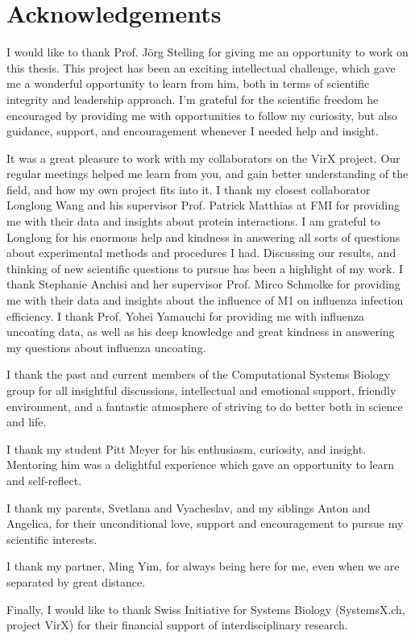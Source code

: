 
\bigskip

\begingroup
\let\clearpage\relax
\let\cleardoublepage\relax
\let\cleardoublepage\relax
\chapter*{Acknowledgements}

\def\thanks#1{%
\begingroup
\leftskip1em
\noindent #1
\par
\endgroup
}

I would like to thank Prof. J\"org Stelling for giving me an opportunity to work on this thesis. This project has been an exciting intellectual challenge, which gave me a wonderful opportunity to learn from him, both in terms of scientific integrity and leadership approach. I'm grateful for the scientific freedom he encouraged by providing me with opportunities to follow my curiosity, but also guidance, support, and encouragement whenever I needed help and insight.

It was a great pleasure to work with my collaborators on the VirX project. Our regular meetings helped me learn from you, and gain better understanding of the field, and how my own project fits into it. I thank my closest collaborator Longlong Wang  and his supervisor Prof. Patrick Matthias at FMI for providing me with their data and insights about protein interactions. I am grateful to Longlong for his enormous help and kindness in answering all sorts of questions about experimental methods and procedures I had. Discussing our results, and thinking of new scientific questions to pursue has been a highlight of my work. I thank Stephanie Anchisi and her supervisor Prof. Mirco Schmolke for providing me with their data and insights about the influence of M1 on influenza infection efficiency. I thank Prof. Yohei Yamauchi for providing me with influenza uncoating data, as well as his deep knowledge and great kindness in answering my questions about influenza uncoating. 

I thank the past and current members of the Computational Systems Biology group for all insightful discussions, intellectual and emotional support, friendly environment, and a fantastic atmosphere of striving to do better both in science and life.

I thank my student Pitt Meyer for his enthusiasm, curiosity, and insight. Mentoring him was a delightful experience which gave an opportunity to learn and self-reflect.

I thank my parents, Svetlana and Vyacheslav, and my siblings Anton and Angelica, for their unconditional love, support and encouragement to pursue my scientific interests. 

I thank my partner, Ming Yim, for always being here for me, even when we are separated by great distance.

Finally, I would like to thank Swiss Initiative for Systems Biology (SystemsX.ch, project VirX) for their financial support of interdisciplinary research.

\endgroup
